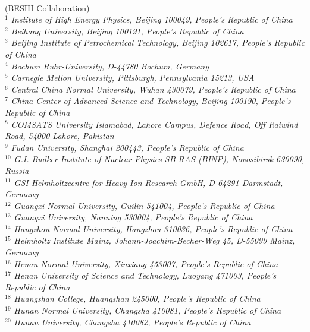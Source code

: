 \begin{small}
\begin{center}
\\
\vspace{0.2cm}
(BESIII Collaboration)\\
\vspace{0.2cm} {\it
$^{1}$ Institute of High Energy Physics, Beijing 100049, People's Republic of China\\
$^{2}$ Beihang University, Beijing 100191, People's Republic of China\\
$^{3}$ Beijing Institute of Petrochemical Technology, Beijing 102617, People's Republic of China\\
$^{4}$ Bochum Ruhr-University, D-44780 Bochum, Germany\\
$^{5}$ Carnegie Mellon University, Pittsburgh, Pennsylvania 15213, USA\\
$^{6}$ Central China Normal University, Wuhan 430079, People's Republic of China\\
$^{7}$ China Center of Advanced Science and Technology, Beijing 100190, People's Republic of China\\
$^{8}$ COMSATS University Islamabad, Lahore Campus, Defence Road, Off Raiwind Road, 54000 Lahore, Pakistan\\
$^{9}$ Fudan University, Shanghai 200443, People's Republic of China\\
$^{10}$ G.I. Budker Institute of Nuclear Physics SB RAS (BINP), Novosibirsk 630090, Russia\\
$^{11}$ GSI Helmholtzcentre for Heavy Ion Research GmbH, D-64291 Darmstadt, Germany\\
$^{12}$ Guangxi Normal University, Guilin 541004, People's Republic of China\\
$^{13}$ Guangxi University, Nanning 530004, People's Republic of China\\
$^{14}$ Hangzhou Normal University, Hangzhou 310036, People's Republic of China\\
$^{15}$ Helmholtz Institute Mainz, Johann-Joachim-Becher-Weg 45, D-55099 Mainz, Germany\\
$^{16}$ Henan Normal University, Xinxiang 453007, People's Republic of China\\
$^{17}$ Henan University of Science and Technology, Luoyang 471003, People's Republic of China\\
$^{18}$ Huangshan College, Huangshan 245000, People's Republic of China\\
$^{19}$ Hunan Normal University, Changsha 410081, People's Republic of China\\
$^{20}$ Hunan University, Changsha 410082, People's Republic of China\\
}
\end{center}
\end{small}
